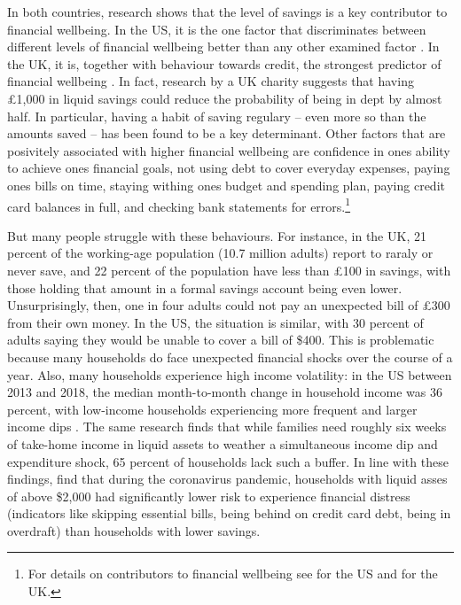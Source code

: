 In both countries, research shows that the level of savings is a key
contributor to financial wellbeing. In the US, it is the one factor that
discriminates between different levels of financial wellbeing better than any
other examined factor \citep{cfpb2017financial}. In the UK, it is, together
with behaviour towards credit, the strongest predictor of financial wellbeing
\citep{mps2018building}. In fact, research by a UK charity suggests that having
\pounds1,000 in liquid savings could reduce the probability of being in dept by
almost half. In particular, having a habit of saving regulary -- even more so
than the amounts saved -- has been found to be a key determinant. Other
factors that are posivitely associated with higher financial wellbeing are
confidence in ones ability to achieve ones financial goals, not using debt to
cover everyday expenses, paying ones bills on time, staying withing ones budget
and spending plan, paying credit card balances in full, and checking bank
statements for errors.\footnote{For details on contributors to financial
wellbeing see \citep{cfpb2017financial} for the US and \citet{mps2018building}
for the UK.}

But many people struggle with these behaviours. For instance, in the UK, 21
percent of the working-age population (10.7 million adults) report to raraly or
never save, and 22 percent of the population have less than \pounds100 in
savings, with those holding that amount in a formal savings account being even
lower. Unsurprisingly, then, one in four adults could not pay an unexpected
bill of \pounds300 from their own money. In the US, the situation is similar,
with 30 percent of adults saying they would be unable to cover a bill of \$400.
This is problematic because many households do face unexpected financial shocks
over the course of a year. Also, many households experience high income
volatility: in the US between 2013 and 2018, the median month-to-month change
in household income was 36 percent, with low-income households experiencing
more frequent and larger income dips \citep{jpmorgan2019weathering}. The same
research finds that while families need roughly six weeks of take-home income
in liquid assets to weather a simultaneous income dip and expenditure shock, 65
percent of households lack such a buffer. In line with these findings,
\citet{roll2020income} find that during the coronavirus pandemic, households
with liquid asses of above \$2,000 had significantly lower risk to experience
financial distress (indicators like skipping essential bills, being behind on
credit card debt, being in overdraft) than households with lower savings. 

